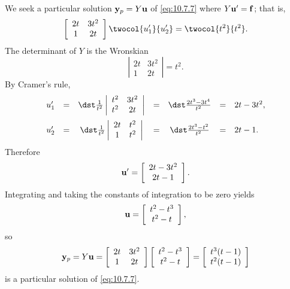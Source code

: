 \begin{examplesolution}
\solution We seek a particular solution ${\bf y}_{p}=Y{\bf u}$ of \eqref{eq:10.7.7} where
$Y{\bf u}'={\bf f}$; that is,
\[
  \left[
  \begin{array}{cc}
    2t & 3t^{2} \\
    1  & 2t
  \end{array}\right]\twocol{u_{1}'}{u_{2}'}=\twocol{t^{2}}{t^{2}}.
\]
The determinant of $Y$ is the Wronskian
\[
  \left|
  \begin{array}{cc}
    2t & 3t^{2} \\
    1  & 2t
  \end{array}\right|=t^{2}.
\]
By Cramer's rule,
\[
  \begin{array}{ccccccl}
    u_{1}' & = & \dst\frac{1}{t^{2}}\left|\begin{array}{cc}t^{2}&3t^{2}\\t^{2}&2t\end{array}\right| & = & \dst\frac{2t^{3}-3t^{4}}{t^{2}} & = & 2t-3t^{2}, \\[4\jot]
    u_{2}' & = & \dst\frac{1}{t^{2}}\left|\begin{array}{cc}2t&t^{2}\\1&t^{2}\end{array}\right|      & = & \dst\frac{2t^{3}-t^{2}}{t^{2}}  & = & 2t-1.
  \end{array}
\]
Therefore
\[
  {\bf u}'=\left[
  \begin{array}{c}
    2t-3t^{2} \\
    2t-1
  \end{array}\right].
\]
Integrating and taking the constants of integration to be zero yields
\[
  {\bf u}=\left[
  \begin{array}{c}
    t^{2}-t^{3} \\
    t^{2}-t
  \end{array}\right],
\]
so
\[
  {\bf y}_{p}=Y{\bf u}= \left[
  \begin{array}{cc}
    2t & 3t^{2} \\
    1  & 2t
  \end{array}\right] \left[
  \begin{array}{c}
    t^{2}-t^{3} \\
    t^{2}-t
  \end{array}\right] =\left[
  \begin{array}{c}
    t^{3}(t-1) \\
    t^{2}(t-1)
  \end{array}\right]
\]
is a particular solution of \eqref{eq:10.7.7}.
\end{examplesolution}

